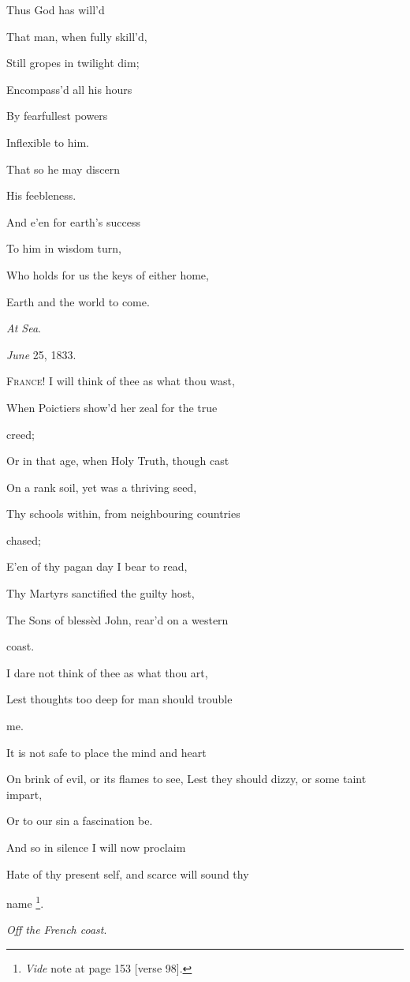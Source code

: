 Thus God has will'd

That man, when fully skill'd,

Still gropes in twilight dim;

Encompass'd all his hours

By fearfullest powers

Inflexible to him.

That so he may discern

His feebleness.

And e'en for earth's success

To him in wisdom turn,

Who holds for us the keys of either home,

Earth and the world to come.

\emph{At Sea}.

\emph{June} 25, 1833.


F\textsc{rance}! I will think of thee as what thou wast,

When Poictiers show'd her zeal for the true

creed;

Or in that age, when Holy Truth, though cast

On a rank soil, yet was a thriving seed,

Thy schools within, from neighbouring countries

chased;

E'en of thy pagan day I bear to read,

Thy Martyrs sanctified the guilty host,

The Sons of blessèd John, rear'd on a western

coast.

I dare not think of thee as what thou art,

Lest thoughts too deep for man should trouble

me.

It is not safe to place the mind and heart

On brink of evil, or its flames to see, Lest they should dizzy, or some taint impart,

Or to our sin a fascination be.

And so in silence I will now proclaim

Hate of thy present self, and scarce will sound thy

name \footnote{\emph{Vide} note at page 153 [verse 98].}.

\emph{Off the French coast}.

